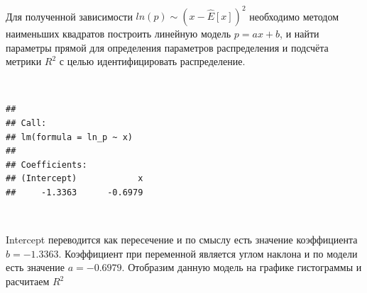 \documentclass[
  14,
]{article}
\newenvironment{Shaded}{\begin{snugshade}}{\end{snugshade}}
\newcommand{\CommentTok}[1]{\textcolor[rgb]{0.56,0.35,0.01}{\textit{#1}}}
\newcommand{\DecValTok}[1]{\textcolor[rgb]{0.00,0.00,0.81}{#1}}
\newcommand{\FunctionTok}[1]{\textcolor[rgb]{0.00,0.00,0.00}{#1}}
\newcommand{\NormalTok}[1]{#1}
\newcommand{\OtherTok}[1]{\textcolor[rgb]{0.56,0.35,0.01}{#1}}
\newcommand{\SpecialCharTok}[1]{\textcolor[rgb]{0.00,0.00,0.00}{#1}}
\begin{document}
\(\ \)

Для полученной зависимости \(ln(p) \sim (x - \hat{E}[x])^2\) необходимо
методом наименьших квадратов построить линейную модель \(p = ax + b\), и
найти параметры прямой для определения параметров распределения и
подсчёта метрики \(R^2\) с целью идентифицировать распределение.

\(\ \)

\begin{Shaded}
\end{Shaded}

\begin{verbatim}
## 
## Call:
## lm(formula = ln_p ~ x)
## 
## Coefficients:
## (Intercept)            x  
##     -1.3363      -0.6979
\end{verbatim}

\(\ \)

Intercept переводится как пересечение и по смыслу есть значение
коэффициента \(b = -1.3363\). Коэффициент при переменной является углом
наклона и по модели есть значение \(a = -0.6979\). Отобразим данную
модель на графике гистограммы и расчитаем \(R^2\)

\(\ \)
\end{document}

